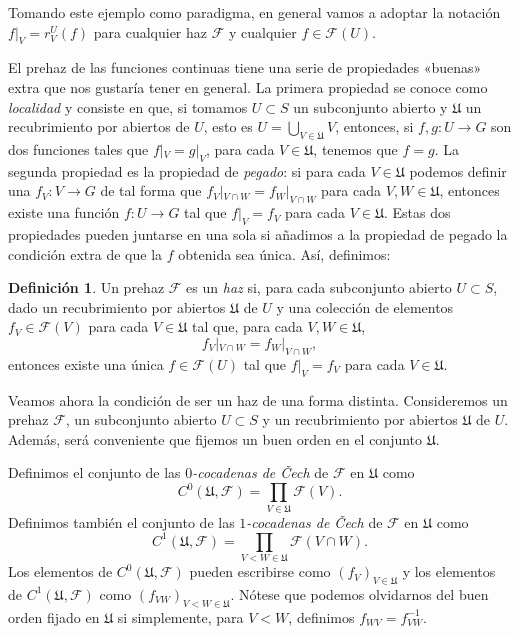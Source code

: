 \documentclass[autocontact]{gaceta}
\theoremstyle{definition} \newtheorem{defn}[thm]{Definición}
\theoremstyle{definition} \newtheorem{ejemplo}[thm]{Ejemplo}
\theoremstyle{definition} \newtheorem{ejercicio}[thm]{Ejercicio}
\def\FF{\mathscr{F}}
\def\UU{\mathfrak{U}}
\begin{document}
  Tomando este ejemplo como paradigma, en general vamos a adoptar la notación $f|_V= r^U_V(f)$ para cualquier haz $\FF$ y cualquier $f\in \FF(U)$.

  El prehaz de las funciones continuas tiene una serie de propiedades «buenas» extra que nos gustaría tener en general. La primera propiedad se conoce como \emph{localidad} y consiste en que, si tomamos $U\subset S$ un subconjunto abierto y $\mathfrak{U}$ un recubrimiento por abiertos de $U$, esto es $U=\bigcup_{V \in \mathfrak{U}} V$, entonces, si $f,g:U\rightarrow G$ son dos funciones tales que $f|_{V} = g|_{V}$, para cada $V\in \mathfrak{U}$, tenemos que $f=g$. La segunda propiedad es la propiedad de \emph{pegado}: si para cada $V\in \mathfrak{U}$ podemos definir una $f_V:V\rightarrow G$ de tal forma que $f_V|_{V\cap W} = f_W|_{V\cap W}$ para cada $V,W \in \mathfrak{U}$, entonces existe una función $f:U\rightarrow G$ tal que $f|_V=f_V$ para cada $V\in \mathfrak{U}$. Estas dos propiedades pueden juntarse en una sola si añadimos a la propiedad de pegado la condición extra de que la $f$ obtenida sea única. Así, definimos:

  \begin{defn}
    Un prehaz $\FF$ es un \emph{haz} si, para cada subconjunto abierto $U\subset S$, dado un recubrimiento por abiertos $\mathfrak{U}$ de $U$ y una colección de elementos $f_V \in \FF(V)$ para cada $V\in \mathfrak{U}$ tal que, para cada $V,W\in \mathfrak{U}$,
    \begin{equation*}
      f_V|_{V\cap W} = f_W|_{V\cap W},
    \end{equation*}
    entonces existe una única $f\in \FF(U)$ tal que $f|_V=f_V$ para cada $V \in \mathfrak{U}$.
  \end{defn}

  Veamos ahora la condición de ser un haz de una forma distinta. Consideremos un prehaz $\FF$, un subconjunto abierto $U\subset S$ y un recubrimiento por abiertos $\UU$ de $U$. Además, será conveniente que fijemos un buen orden en el conjunto $\UU$. 

  Definimos el conjunto de las \emph{$0$-cocadenas de \v{C}ech} de $\FF$ en $\UU$ como
  \begin{equation*}
    C^0(\UU,\FF) = \prod_{V\in \UU} \FF(V).
  \end{equation*}
  Definimos también el conjunto de las \emph{$1$-cocadenas de \v{C}ech} de $\FF$ en $\UU$ como
  \begin{equation*}
    C^1(\UU,\FF) = \prod_{V<W\in \UU} \FF(V\cap W).
  \end{equation*}
  Los elementos de $C^0(\UU,\FF)$ pueden escribirse como $(f_V)_{V\in \UU}$ y los elementos de $C^1(\UU,\FF)$ como $(f_{VW})_{V<W \in \UU}$. Nótese que podemos olvidarnos del buen orden fijado en $\UU$ si simplemente, para $V<W$, definimos $f_{WV}=f_{VW}^{-1}$. 
  
\end{document}

